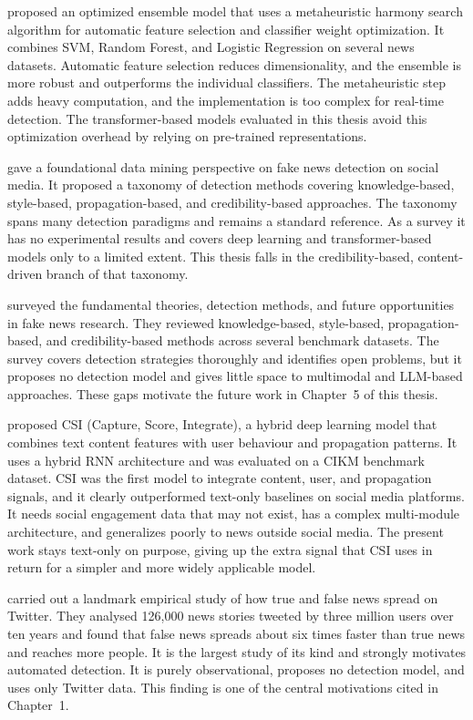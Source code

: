 \citep{Huang2020FakeNews} proposed an optimized ensemble model that uses a metaheuristic harmony search algorithm for automatic feature selection and classifier weight optimization. It combines SVM, Random Forest, and Logistic Regression on several news datasets. Automatic feature selection reduces dimensionality, and the ensemble is more robust and outperforms the individual classifiers. The metaheuristic step adds heavy computation, and the implementation is too complex for real-time detection. The transformer-based models evaluated in this thesis avoid this optimization overhead by relying on pre-trained representations.

\citep{Shu2017FakeNewsDetection} gave a foundational data mining perspective on fake news detection on social media. It proposed a taxonomy of detection methods covering knowledge-based, style-based, propagation-based, and credibility-based approaches. The taxonomy spans many detection paradigms and remains a standard reference. As a survey it has no experimental results and covers deep learning and transformer-based models only to a limited extent. This thesis falls in the credibility-based, content-driven branch of that taxonomy.

\citep{Zhou2020Survey} surveyed the fundamental theories, detection methods, and future opportunities in fake news research. They reviewed knowledge-based, style-based, propagation-based, and credibility-based methods across several benchmark datasets. The survey covers detection strategies thoroughly and identifies open problems, but it proposes no detection model and gives little space to multimodal and LLM-based approaches. These gaps motivate the future work in Chapter~5 of this thesis.

\citep{Ruchansky2017CSI} proposed CSI (Capture, Score, Integrate), a hybrid deep learning model that combines text content features with user behaviour and propagation patterns. It uses a hybrid RNN architecture and was evaluated on a CIKM benchmark dataset. CSI was the first model to integrate content, user, and propagation signals, and it clearly outperformed text-only baselines on social media platforms. It needs social engagement data that may not exist, has a complex multi-module architecture, and generalizes poorly to news outside social media. The present work stays text-only on purpose, giving up the extra signal that CSI uses in return for a simpler and more widely applicable model.

\citep{Vosoughi2018Spread} carried out a landmark empirical study of how true and false news spread on Twitter. They analysed 126,000 news stories tweeted by three million users over ten years and found that false news spreads about six times faster than true news and reaches more people. It is the largest study of its kind and strongly motivates automated detection. It is purely observational, proposes no detection model, and uses only Twitter data. This finding is one of the central motivations cited in Chapter~1.


